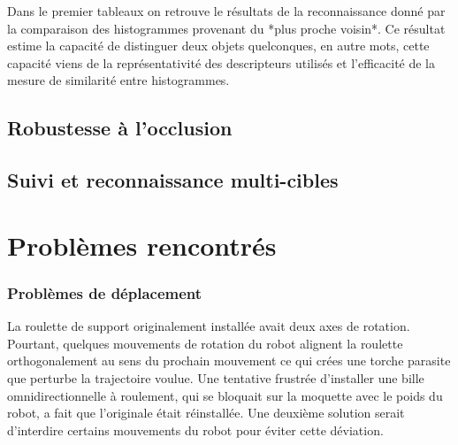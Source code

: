 \begin{figure}[H]
\end{figure}


{\color{green}
Dans le premier tableaux on retrouve le résultats de la reconnaissance donné par la comparaison des histogrammes provenant du *plus proche voisin*. Ce résultat estime la capacité de distinguer deux objets quelconques, en autre mots, cette capacité viens de la représentativité des descripteurs utilisés et l'efficacité de la mesure de similarité entre histogrammes.
}

\subsection{Robustesse à l'occlusion}

\subsection{Suivi et reconnaissance multi-cibles}


\section{Problèmes rencontrés}

\subsubsection{Problèmes de déplacement}

La roulette de support originalement installée avait deux axes de
rotation. Pourtant, quelques mouvements de rotation du robot alignent
la roulette orthogonalement au sens du prochain mouvement ce qui crées
une torche parasite que perturbe la trajectoire voulue. Une tentative
frustrée d'installer une bille omnidirectionnelle à roulement, qui se
bloquait sur la moquette avec le poids du robot, a fait que
l'originale était réinstallée. Une deuxième solution serait d'interdire
certains mouvements du robot pour éviter cette déviation.